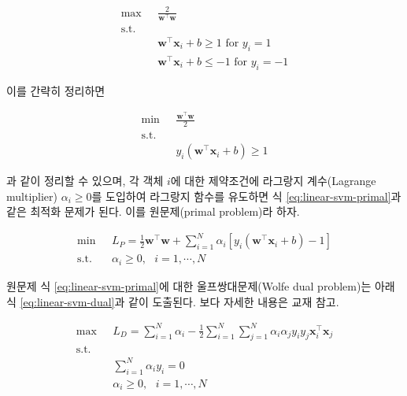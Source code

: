 \documentclass[]{book}
\begin{document}
\begin{equation*}
\begin{split}
\max \text{  } & \frac{2}{\mathbf{w}^\top \mathbf{w}}\\
\text{s.t.}& \\
& \mathbf{w}^\top \mathbf{x}_i + b \ge 1 \text{ for } y_i = 1\\
& \mathbf{w}^\top \mathbf{x}_i + b \le -1 \text{ for } y_i = -1
\end{split}
\end{equation*}

이를 간략히 정리하면

\begin{equation*}
\begin{split}
\min \text{  } & \frac{\mathbf{w}^\top \mathbf{w}}{2}\\
\text{s.t.}& \\
& y_i \left( \mathbf{w}^\top \mathbf{x}_i + b \right) \ge 1
\end{split}
\end{equation*}

과 같이 정리할 수 있으며, 각 객체 \(i\)에 대한 제약조건에 라그랑지 계수(Lagrange multiplier) \(\alpha_i \ge 0\)를 도입하여 라그랑지 함수를 유도하면 식 \eqref{eq:linear-svm-primal}과 같은 최적화 문제가 된다. 이를 원문제(primal problem)라 하자.

\begin{equation}
\begin{split}
\min \text{  } & L_P = \frac{1}{2} \mathbf{w}^\top \mathbf{w} + \sum_{i = 1}^{N} \alpha_i \left[ y_i \left( \mathbf{w}^\top \mathbf{x}_i + b \right) - 1 \right]\\
\text{s.t.  } & \alpha_i \ge 0, \text{  } i = 1, \cdots, N
\end{split}
\label{eq:linear-svm-primal}
\end{equation}

원문제 식 \eqref{eq:linear-svm-primal}에 대한 울프쌍대문제(Wolfe dual problem)는 아래 식 \eqref{eq:linear-svm-dual}과 같이 도출된다. 보다 자세한 내용은 교재\citep{jun2012datamining} 참고.

\begin{equation}
\begin{split}
\max \text{  } & L_D = \sum_{i = 1}^{N} \alpha_i - \frac{1}{2} \sum_{i = 1}^{N} \sum_{j = 1}^{N} \alpha_i \alpha_j y_i y_j \mathbf{x}_i^\top \mathbf{x}_j\\
\text{s.t. } &\\
& \sum_{i = 1}^{N} \alpha_i y_i = 0\\
& \alpha_i \ge 0, \text{  } i = 1, \cdots, N
\end{split}
\label{eq:linear-svm-dual}
\end{equation}
\end{document}
